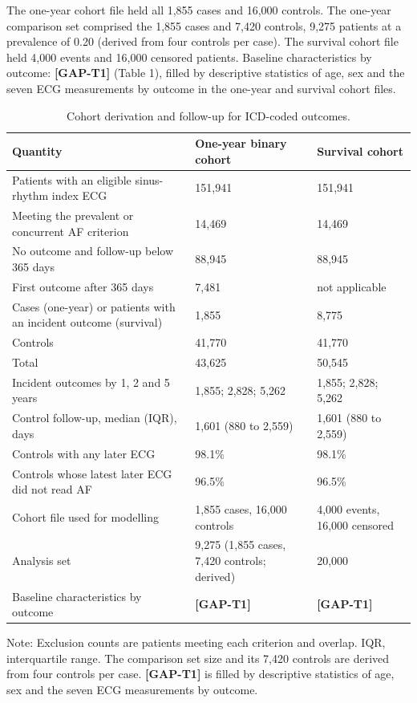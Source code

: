 \documentclass[preprint,12pt]{elsarticle}
\begin{document}
The one-year cohort file held all 1,855 cases and 16,000 controls. The one-year comparison set comprised the 1,855 cases and 7,420 controls, 9,275 patients at a prevalence of 0.20 (derived from four controls per case). The survival cohort file held 4,000 events and 16,000 censored patients. Baseline characteristics by outcome: \textbf{[GAP-T1]} (Table 1), filled by descriptive statistics of age, sex and the seven ECG measurements by outcome in the one-year and survival cohort files.

\begin{table}[htbp]
\centering
\small
\caption{Cohort derivation and follow-up for ICD-coded outcomes.}
\label{tab:cohort}
\begin{tabularx}{\textwidth}{@{}L{0.42\textwidth}YY@{}}
\toprule
Quantity & One-year binary cohort & Survival cohort \\
\midrule
Patients with an eligible sinus-rhythm index ECG & 151,941 & 151,941 \\
Meeting the prevalent or concurrent AF criterion & 14,469 & 14,469 \\
No outcome and follow-up below 365 days & 88,945 & 88,945 \\
First outcome after 365 days & 7,481 & not applicable \\
Cases (one-year) or patients with an incident outcome (survival) & 1,855 & 8,775 \\
Controls & 41,770 & 41,770 \\
Total & 43,625 & 50,545 \\
Incident outcomes by 1, 2 and 5 years & 1,855; 2,828; 5,262 & 1,855; 2,828; 5,262 \\
Control follow-up, median (IQR), days & 1,601 (880 to 2,559) & 1,601 (880 to 2,559) \\
Controls with any later ECG & 98.1\% & 98.1\% \\
Controls whose latest later ECG did not read AF & 96.5\% & 96.5\% \\
Cohort file used for modelling & 1,855 cases, 16,000 controls & 4,000 events, 16,000 censored \\
Analysis set & 9,275 (1,855 cases, 7,420 controls; derived) & 20,000 \\
Baseline characteristics by outcome & \textbf{[GAP-T1]} & \textbf{[GAP-T1]} \\
\bottomrule
\end{tabularx}

\smallskip
\raggedright
Note: Exclusion counts are patients meeting each criterion and overlap. IQR, interquartile range. The comparison set size and its 7,420 controls are derived from four controls per case. \textbf{[GAP-T1]} is filled by descriptive statistics of age, sex and the seven ECG measurements by outcome.
\end{table}
\end{document}
